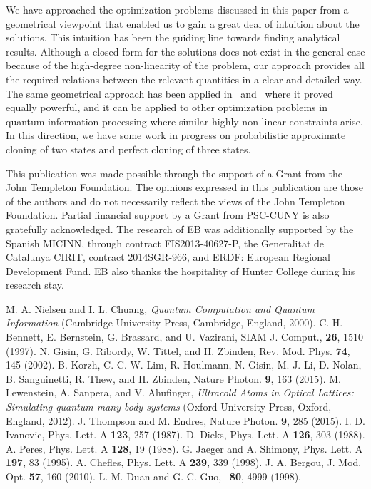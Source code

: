 \documentclass[aps,pra,twocolumn,showpacs]{revtex4-1}
\begin{document}
{We have approached the optimization problems discussed in this paper from a geometrical viewpoint that enabled us to gain a great deal of intuition about the solutions. This intuition has been the guiding line towards finding analytical results. Although a closed form for the solutions does not exist in the general case because of the high-degree non-linearity of the problem, our approach provides all the required relations between the relevant quantities in a clear and detailed way. The same geometrical approach has been applied in~\cite{us1}  and~\cite{Bergou1} where it proved equally powerful, and it can be applied to other optimization problems in quantum information processing where similar highly non-linear constraints arise. In this direction, we have some work in progress on probabilistic approximate cloning of two states and perfect cloning of three states. 

\begin{acknowledgments}
This publication was made possible through the support of a Grant from the John Templeton Foundation. The opinions expressed in this publication are those of the authors and do not necessarily reflect the views of the John Templeton Foundation. Partial financial support by a Grant from PSC-CUNY is also gratefully acknowledged. The research of EB was additionally supported by 
the Spanish MICINN, through contract FIS2013-40627-P, the Generalitat de
Catalunya CIRIT, contract  2014SGR-966, and ERDF: European Regional Development Fund. EB also thanks the hospitality of Hunter College during his research stay.
\end{acknowledgments}



\begin{thebibliography}{99}

 M. A. Nielsen and I. L. Chuang, {\it Quantum Computation and
Quantum Information} (Cambridge University Press, Cambridge,
England, 2000).
 C. H. Bennett, E. Bernstein, G. Brassard, and U. Vazirani, SIAM J. Comput., {\bf26}, 1510 (1997).
 N. Gisin, G. Ribordy, W. Tittel, and H. Zbinden, Rev. Mod. Phys. {\bf74}, 145 (2002).
 B. Korzh, C. C. W. Lim, R. Houlmann, N. Gisin, M. J. Li, D. Nolan, B. Sanguinetti, R. Thew, and H. Zbinden, Nature Photon. \textbf{9}, 163 (2015).
M. Lewenstein, A. Sanpera, and V. Ahufinger, {\em Ultracold Atoms in Optical Lattices:
Simulating quantum many-body systems} (Oxford University Press, Oxford,
England, 2012).
J. Thompson and M. Endres, Nature Photon. {\bf9}, 285 (2015).
 I. D. Ivanovic, Phys. Lett. A {\bf 123}, 257 (1987).
 D. Dieks, Phys. Lett. A {\bf 126}, 303 (1988).
 A. Peres, Phys. Lett. A {\bf 128}, 19 (1988).
 G. Jaeger and A. Shimony, Phys. Lett. A {\bf 197}, 83 (1995).
A. Chefles, Phys. Lett. A {\bf239}, 339 (1998).
 J. A. Bergou, J. Mod. Opt. {\bf 57}, 160 (2010).
 L. M. Duan and G.-C. Guo, \prl~\textbf{80}, 4999 (1998).


\end{thebibliography}}
\end{document}
